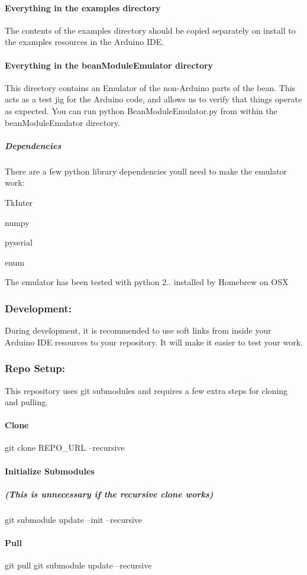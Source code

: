 \paragraph*{Everything in the {\ttfamily examples} directory}

The contents of the examples directory should be copied separately on install to the examples resources in the Arduino I\+DE.

\paragraph*{Everything in the {\ttfamily bean\+Module\+Emulator} directory}

This directory contains an Emulator of the \textquotesingle{}non-\/\+Arduino\textquotesingle{} parts of the bean. This acts as a test jig for the Arduino code, and allows us to verify that things operate as expected. You can run {\ttfamily python Bean\+Module\+Emulator.\+py} from within the bean\+Module\+Emulator directory.

\subparagraph*{Dependencies}

There are a few python library dependencies you\textquotesingle{}ll need to make the emulator work\+:


\begin{DoxyItemize}
\item Tk\+Inter
\item numpy
\item pyserial
\item enum
\end{DoxyItemize}

The emulator has been tested with python 2.. installed by Homebrew on O\+SX

\subsubsection*{Development\+:}

During development, it is recommended to use soft links from inside your Arduino I\+DE resources to your repository. It will make it easier to test your work.

\subsubsection*{Repo Setup\+:}

This repository uses git submodules and requires a few extra steps for cloning and pulling. \paragraph*{Clone}

git clone R\+E\+P\+O\+\_\+\+U\+RL --recursive

\paragraph*{Initialize Submodules}

\subparagraph*{(This is unnecessary if the recursive clone works)}

git submodule update --init --recursive

\paragraph*{Pull}

git pull git submodule update --recursive 